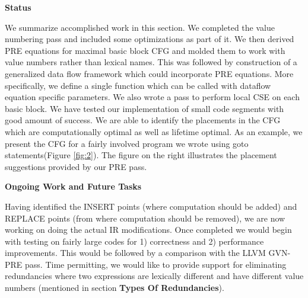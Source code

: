 \vspace{1 mm}
\begin{flushleft}
\textbf{\Large{Status}}
\end{flushleft}
We summarize accomplished work in this section. We completed the value numbering pass and included some 
optimizations as part of it. We then derived PRE equations for maximal basic block CFG and molded them 
to work with value numbers rather than lexical names. This was followed by construction of a generalized 
data flow framework which could incorporate PRE equations. More specifically, we define a single function 
which can be called with dataflow equation specific parameters. We also wrote a pass to perform local CSE on each basic block.
We have tested our implementation of small code segments with good amount of success. We are able to identify 
the placements in the CFG which are computationally optimal as well as lifetime optimal. As an example, we present the CFG for a 
fairly involved program we wrote using goto statements(Figure \ref{fig:2}). The figure on the right illustrates the placement
suggestions provided by our PRE pass.

\begin{flushleft}
\textbf{\Large{Ongoing Work and Future Tasks}}
\end{flushleft}
Having identified the INSERT points (where computation should be added) and REPLACE points (from where computation should be removed), 
we are now working on doing the actual IR modifications. Once completed we would begin with testing on fairly large codes for 1) 
correctness and 2) performance improvements. This would be followed by a comparison with the LLVM GVN-PRE pass. Time permitting, 
we would like to provide support for eliminating redundancies where two expressions are lexically different and have different value numbers 
(mentioned in section \textbf{Types Of Redundancies}).

           
